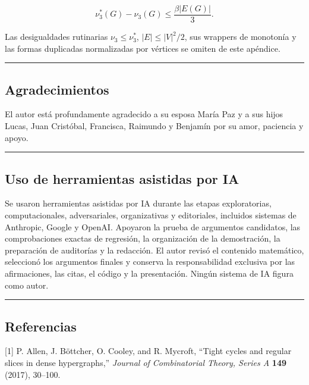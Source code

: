 \documentclass[spanish,11pt,a4paper]{article}
\begin{document}
\[\nu_3^*(G)-\nu_3(G)\le\frac{\beta|E(G)|}{3}.\]

Las desigualdades rutinarias \(\nu_3\le\nu_3^*\), \(|E|\le|V|^2/2\), sus
wrappers de monotonía y las formas duplicadas normalizadas por vértices
se omiten de este apéndice.

\begin{center}\rule{0.5\linewidth}{0.5pt}\end{center}

\subsection{Agradecimientos}\label{agradecimientos}

El autor está profundamente agradecido a su esposa María Paz y a sus
hijos Lucas, Juan Cristóbal, Francisca, Raimundo y Benjamín por su amor,
paciencia y apoyo.

\begin{center}\rule{0.5\linewidth}{0.5pt}\end{center}

\subsection{Uso de herramientas asistidas por
IA}\label{uso-de-herramientas-asistidas-por-ia}

Se usaron herramientas asistidas por IA durante las etapas
exploratorias, computacionales, adversariales, organizativas y
editoriales, incluidos sistemas de Anthropic, Google y OpenAI. Apoyaron
la prueba de argumentos candidatos, las comprobaciones exactas de
regresión, la organización de la demostración, la preparación de
auditorías y la redacción. El autor revisó el contenido matemático,
seleccionó los argumentos finales y conserva la responsabilidad
exclusiva por las afirmaciones, las citas, el código y la presentación.
Ningún sistema de IA figura como autor.

\begin{center}\rule{0.5\linewidth}{0.5pt}\end{center}

\subsection{Referencias}\label{referencias}

{[}1{]} P. Allen, J. Böttcher, O. Cooley, and R. Mycroft, ``Tight cycles
and regular slices in dense hypergraphs,'' \emph{Journal of
Combinatorial Theory, Series A} \textbf{149} (2017), 30--100.
\end{document}
